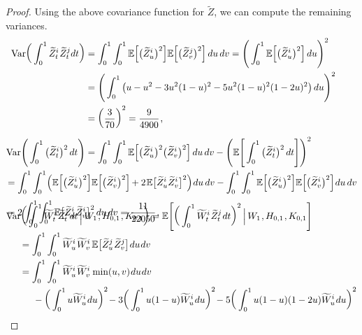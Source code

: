 \documentclass[sn-mathphys-num]{sn-jnl}%
\newcommand{\E}{\mathbb{E}}
\newcommand{\m}{\hspace{0.25mm}}
\newcommand{\mm}{\hspace{5mm}}
\newcommand{\var}{\mathrm{Var}}
\begin{document}
\begin{proof}
Using the above covariance function for $\widetilde{Z}$, we can compute the remaining variances. 
\begin{align*}
\var\bigg(\int_0^1 \widetilde{Z}_t^i\m \widetilde{Z}_t^j dt\bigg) & = \int_0^1\int_0^1 \E\Big[\big(\widetilde{Z}_u^i\big)^2\Big]\E\Big[\big(\widetilde{Z}_v^j\big)^2\Big]\, du\, dv = \Bigg(\int_0^1 \E\Big[\big(\widetilde{Z}_u^i\big)^2\Big]\, du\Bigg)^2 \\
& = \Bigg(\int_0^1 \big(u - u^2 - 3u^2(1-u)^2 - 5u^2(1-u)^2(1-2u)^2\big)\, du\Bigg)^2\\
& = \bigg(\frac{3}{70}\bigg)^2 = \frac{9}{4900}\m,\\[3pt]
\var\Bigg(\int_0^1\big(\widetilde{Z}_t^i\big)^2\, dt\Bigg) & = \int_0^1\int_0^1 \E\Big[\big(\widetilde{Z}_u^i\big)^2\big(\widetilde{Z}_v^i\big)^2\Big]\, du\, dv - \Bigg(\E\Bigg[\int_0^1\big(\widetilde{Z}_t^i\big)^2\, dt\Bigg]\Bigg)^2\\
&\hspace{-30mm} = \int_0^1\int_0^1 \hspace{-0.5mm}\Big(\E\Big[\big(\widetilde{Z}_u^i\big)^2\Big]\E\Big[\big(\widetilde{Z}_v^i\big)^2\Big]\hspace{-0.25mm} + 2\m\E\big[\widetilde{Z}_u^i\widetilde{Z}_v^i\big]^2\Big)\m du\, dv - \int_0^1\int_0^1\E\Big[\big(\widetilde{Z}_u^i\big)^2\Big]\E\Big[\big(\widetilde{Z}_v^i\big)^2\Big]\m du\, dv\\[3pt]
&\hspace{-30mm} = 2\int_0^1\int_0^1 \E\big[\widetilde{Z}_u^i\widetilde{Z}_v^i\big]^2\, du\, dv = \frac{11}{22050}\m,\\[-30pt]
\end{align*}
\begin{align*}
& \var\bigg(\int_0^1 \widetilde{W}_t^i\m \widetilde{Z}_t^j\m dt\, \Big|\, W_1\m, H_{0,1}\m, K_{0,1}\bigg) =  \E\Bigg[\bigg(\int_0^1 \widetilde{W}_t^i\m \widetilde{Z}_t^j\m dt\bigg)^2\, \Big|\, W_1\m, H_{0,1}\m, K_{0,1}\Bigg]\\[-2pt]
&\mm = \int_0^1\int_0^1 \widetilde{W}_u^i\m \widetilde{W}_v^i\,\E\big[\widetilde{Z}_u^j\m \widetilde{Z}_v^j\big]\m du\m dv\\
&\mm = \int_0^1\int_0^1 \widetilde{W}_u^i\m \widetilde{W}_v^i\m\min(u,v) \m du\m dv\\
&\mm\mm - \bigg(\int_0^1 u\widetilde{W}_u^i\m du\bigg)^2\hspace{-0.5mm} - 3\bigg(\int_0^1 u(1-u)\widetilde{W}_u^i\m du\bigg)^2\hspace{-0.5mm} - 5\bigg(\int_0^1 u(1-u)(1-2u)\widetilde{W}_u^i\m du\bigg)^2\\

\end{align*}
\end{proof}
\end{document}
